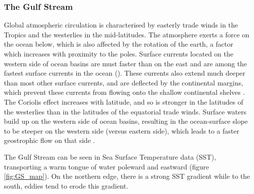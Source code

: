 

\subsubsection {The Gulf Stream}

Global atmospheric circulation is characterised by easterly trade winds in the Tropics and the westerlies in the mid-latitudes.  The atmosphere exerts a force on the ocean below, which is also affected by the rotation of the earth, a factor which increases with proximity to the poles. Surface currents located on the western side of ocean basins are must faster than on the east and are among the fastest surface currents in the ocean (\citep{nasa_ocean}).  These currents also extend much deeper than most other surface currents, and are deflected by the continental margins, which prevent these currents from flowing onto the shallow continental shelves \citep{nasa_wbc}.
The Coriolis effect increases with latitude, and so is stronger in the latitudes of the westerlies than in the latitudes of the equatorial trade winds. Surface waters build up on the western side of ocean basins, resulting in the ocean-surface slope to be steeper on the western side (versus eastern side), which leads to a faster geostrophic flow on that side \citep{nasa_wbc}.

The Gulf Stream can be seen in Sea Surface Temperature data (SST), transporting a warm tongue of water poleward and eastward (figure \ref{fig:GS_map}). On the northern edge, there is a strong SST gradient while to the south, eddies tend to erode this gradient.

